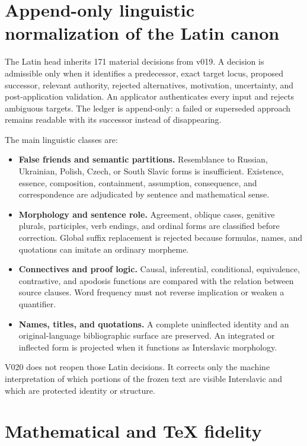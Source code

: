\documentclass[11pt]{article}
\begin{document}
\section{Append-only linguistic normalization of the Latin canon}

The Latin head inherits 171 material decisions from v019. A decision is admissible only when it identifies a predecessor, exact target locus, proposed successor, relevant authority, rejected alternatives, motivation, uncertainty, and post-application validation. An applicator authenticates every input and rejects ambiguous targets. The ledger is append-only: a failed or superseded approach remains readable with its successor instead of disappearing.

The main linguistic classes are:

\begin{itemize}
\item \textbf{False friends and semantic partitions.} Resemblance to Russian, Ukrainian, Polish, Czech, or South Slavic forms is insufficient. Existence, essence, composition, containment, assumption, consequence, and correspondence are adjudicated by sentence and mathematical sense.
\item \textbf{Morphology and sentence role.} Agreement, oblique cases, genitive plurals, participles, verb endings, and ordinal forms are classified before correction. Global suffix replacement is rejected because formulas, names, and quotations can imitate an ordinary morpheme.
\item \textbf{Connectives and proof logic.} Causal, inferential, conditional, equivalence, contrastive, and apodosis functions are compared with the relation between source clauses. Word frequency must not reverse implication or weaken a quantifier.
\item \textbf{Names, titles, and quotations.} A complete uninflected identity and an original-language bibliographic surface are preserved. An integrated or inflected form is projected when it functions as Interslavic morphology.
\end{itemize}

V020 does not reopen those Latin decisions. It corrects only the machine interpretation of which portions of the frozen text are visible Interslavic and which are protected identity or structure.

\section{Mathematical and TeX fidelity}
\end{document}
